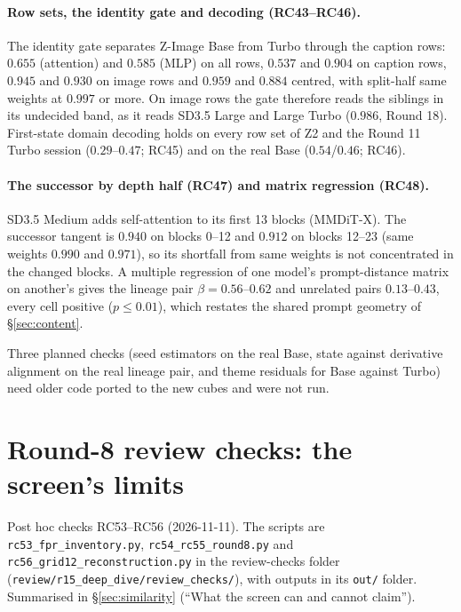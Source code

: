 \paragraph{Row sets, the identity gate and decoding (RC43--RC46).} The identity gate separates Z-Image Base from Turbo through the caption rows: $0.655$ (attention) and $0.585$ (MLP) on all rows, $0.537$ and $0.904$ on caption rows, $0.945$ and $0.930$ on image rows and $0.959$ and $0.884$ centred, with split-half same weights at $0.997$ or more. On image rows the gate therefore reads the siblings in its undecided band, as it reads SD3.5 Large and Large Turbo ($0.986$, Round 18). First-state domain decoding holds on every row set of Z2 and the Round 11 Turbo session ($0.29$--$0.47$; RC45) and on the real Base ($0.54$/$0.46$; RC46).

\paragraph{The successor by depth half (RC47) and matrix regression (RC48).} SD3.5 Medium adds self-attention to its first 13 blocks (MMDiT-X). The successor tangent is $0.940$ on blocks 0--12 and $0.912$ on blocks 12--23 (same weights $0.990$ and $0.971$), so its shortfall from same weights is not concentrated in the changed blocks. A multiple regression of one model's prompt-distance matrix on another's gives the lineage pair $\beta=0.56$--$0.62$ and unrelated pairs $0.13$--$0.43$, every cell positive ($p\le0.01$), which restates the shared prompt geometry of \S\ref{sec:content}.

Three planned checks (seed estimators on the real Base, state against derivative alignment on the real lineage pair, and theme residuals for Base against Turbo) need older code ported to the new cubes and were not run.

\section{Round-8 review checks: the screen's limits}\label{supp:round8}
{\sloppy Post hoc checks RC53--RC56 (2026-11-11). The scripts are \texttt{rc53\_fpr\_inventory.py}, \texttt{rc54\_rc55\_round8.py} and \texttt{rc56\_grid12\_reconstruction.py} in the review-checks folder (\texttt{review/\allowbreak r15\_deep\_dive/\allowbreak review\_checks/}), with outputs in its \texttt{out/} folder. Summarised in \S\ref{sec:similarity} (``What the screen can and cannot claim'').\par}

